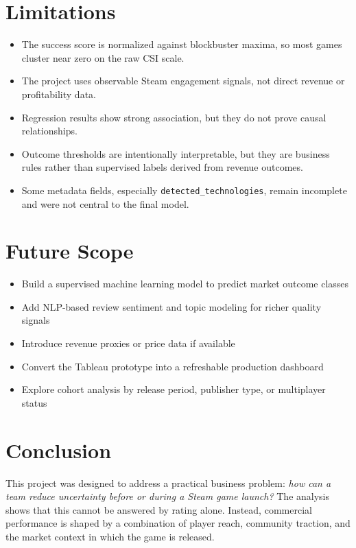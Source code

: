 \documentclass[12pt,a4paper]{report}
\begin{document}
\chapter{Limitations}

\begin{itemize}
\item The success score is normalized against blockbuster maxima, so most games cluster near zero on the raw CSI scale.
\item The project uses observable Steam engagement signals, not direct revenue or profitability data.
\item Regression results show strong association, but they do not prove causal relationships.
\item Outcome thresholds are intentionally interpretable, but they are business rules rather than supervised labels derived from revenue outcomes.
\item Some metadata fields, especially \texttt{detected\_technologies}, remain incomplete and were not central to the final model.
\end{itemize}

\chapter{Future Scope}

\begin{itemize}
\item Build a supervised machine learning model to predict market outcome classes
\item Add NLP-based review sentiment and topic modeling for richer quality signals
\item Introduce revenue proxies or price data if available
\item Convert the Tableau prototype into a refreshable production dashboard
\item Explore cohort analysis by release period, publisher type, or multiplayer status
\end{itemize}

\chapter{Conclusion}

This project was designed to address a practical business problem: \textit{how can a team reduce uncertainty before or during a Steam game launch?} The analysis shows that this cannot be answered by rating alone. Instead, commercial performance is shaped by a combination of player reach, community traction, and the market context in which the game is released.
\end{document}
